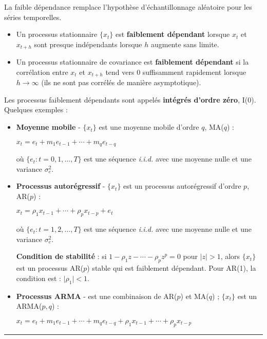   \begin{f}

La faible dépendance remplace l'hypothèse d'échantillonnage aléatoire pour les séries temporelles.

\begin{itemize}[leftmargin=*]
	\item Un processus stationnaire \(\lbrace x_{t} \rbrace\) est \textbf{faiblement dépendant} lorsque \(x_{t}\) et \(x_{t + h}\) sont presque indépendants lorsque \(h\) augmente sans limite.
	\item Un processus stationnaire de covariance est \textbf{faiblement dépendant} si la corrélation entre \(x_{t}\) et \(x_{t + h}\) tend vers \(0\) suffisamment rapidement lorsque \(h \rightarrow \infty\) (ils ne sont pas corrélés de manière asymptotique).
\end{itemize}

Les processus faiblement dépendants sont appelés \textbf{intégrés d'ordre zéro}, I(0). Quelques exemples :

\begin{itemize}[leftmargin=*]
\item \textbf{Moyenne mobile} - \(\lbrace x_{t} \rbrace\) est une moyenne mobile d'ordre \(q\), MA(\(q\)) :

\begin{center}
	\(x_{t} = e_{t} + m_{1} e_{t - 1} + \cdots + m_{q} e_{t - q}\)
\end{center}

où \(\lbrace e_{t} : t = 0, 1, \ldots, T \rbrace\) est une séquence \textsl{i.i.d.} avec une moyenne nulle et une variance \(\sigma^{2}_{e}\).

\item \textbf{Processus autorégressif} - \(\lbrace x_{t} \rbrace\) est un processus autorégressif d'ordre \(p\), AR(\(p\)) :

\begin{center}
	\(x_{t} = \rho_{1} x_{t - 1} + \cdots + \rho_{p} x_{t - p} + e_{t}\)
\end{center}

où \(\lbrace e_{t} : t = 1, 2, \ldots, T \rbrace\) est une séquence \textsl{i.i.d.} avec une moyenne nulle et une variance \(\sigma^{2}_{e}\).

\textbf{Condition de stabilité} : si \(1 - \rho_{1} z - \cdots - \rho_{p} z^{p} = 0\) pour \(\lvert z \rvert > 1\), alors \(\lbrace x_{t} \rbrace\) est un processus AR(\(p\)) stable qui est faiblement dépendant. Pour AR(1), la condition est : \(\lvert \rho_{1} \rvert < 1\).

\item \textbf{Processus ARMA} - est une combinaison de AR(\(p\)) et MA(\(q\)) ; \(\lbrace x_{t} \rbrace\) est un ARMA(\(p, q\)) :

\begin{center}
	\(x_{t} = e_{t} + m_{1} e_{t - 1} + \cdots + m_{q} e_{t - q} + \rho_{1} x_{t - 1} + \cdots + \rho_{p} x_{t - p}\)
\end{center}
\end{itemize}


		\end{f}  \hrule

